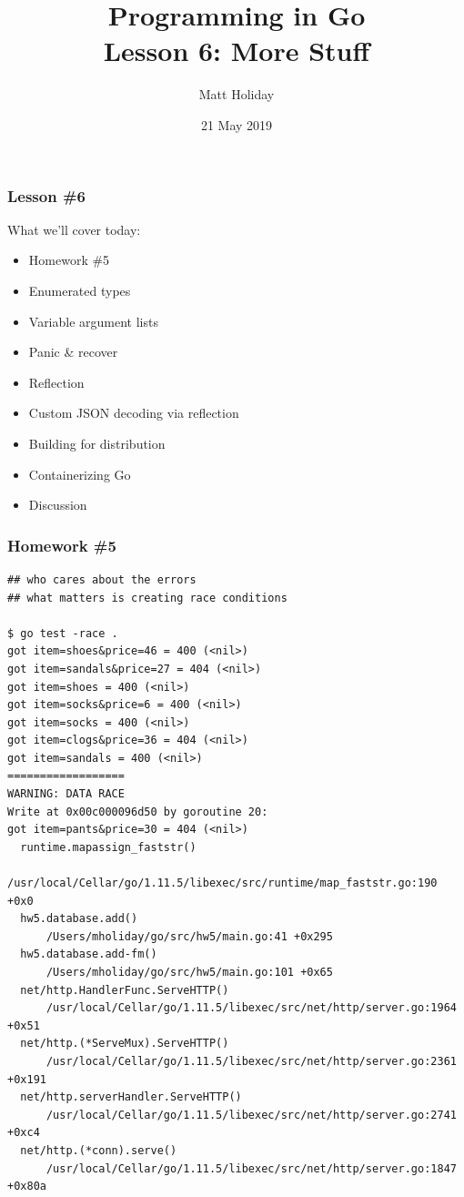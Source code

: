 \documentclass[handout,compress,t,11pt]{beamer}
\title[Programming in Go]{\bf Programming in Go\\ Lesson 6: More Stuff}
\author{Matt Holiday}
\institute[CP]{Cardinal Peak}
\date{21 May 2019}
\begin{document}
\frame{\titlepage} 

\begin{frame}[fragile]
    \frametitle{Lesson \#6}
    What we'll cover today:
    \begin{itemize}
    \item Homework \#5
    \item Enumerated types
    \item Variable argument lists
    \item Panic \& recover
    \item Reflection
    \item Custom JSON decoding via reflection
    \item Building for distribution
    \item Containerizing Go
    \item Discussion
    \end{itemize}
\end{frame}




\begin{frame}[fragile]
\frametitle{Homework \#5}
{\tiny
\begin{verbatim}
## who cares about the errors
## what matters is creating race conditions

$ go test -race .
got item=shoes&price=46 = 400 (<nil>)
got item=sandals&price=27 = 404 (<nil>)
got item=shoes = 400 (<nil>)
got item=socks&price=6 = 400 (<nil>)
got item=socks = 400 (<nil>)
got item=clogs&price=36 = 404 (<nil>)
got item=sandals = 400 (<nil>)
==================
WARNING: DATA RACE
Write at 0x00c000096d50 by goroutine 20:
got item=pants&price=30 = 404 (<nil>)
  runtime.mapassign_faststr()
      /usr/local/Cellar/go/1.11.5/libexec/src/runtime/map_faststr.go:190 +0x0
  hw5.database.add()
      /Users/mholiday/go/src/hw5/main.go:41 +0x295
  hw5.database.add-fm()
      /Users/mholiday/go/src/hw5/main.go:101 +0x65
  net/http.HandlerFunc.ServeHTTP()
      /usr/local/Cellar/go/1.11.5/libexec/src/net/http/server.go:1964 +0x51
  net/http.(*ServeMux).ServeHTTP()
      /usr/local/Cellar/go/1.11.5/libexec/src/net/http/server.go:2361 +0x191
  net/http.serverHandler.ServeHTTP()
      /usr/local/Cellar/go/1.11.5/libexec/src/net/http/server.go:2741 +0xc4
  net/http.(*conn).serve()
      /usr/local/Cellar/go/1.11.5/libexec/src/net/http/server.go:1847 +0x80a
\end{verbatim}}
\end{frame}
\end{document}
